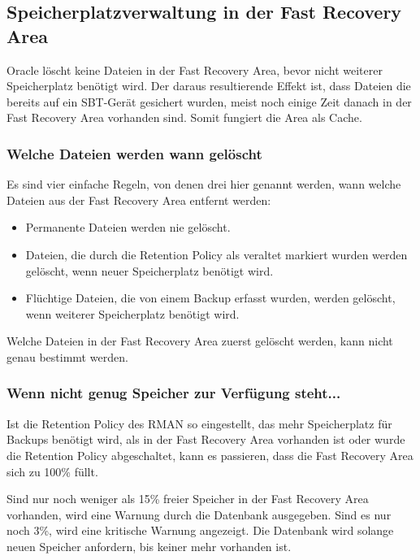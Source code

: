       \subsection{Speicherplatzverwaltung in der Fast Recovery Area}
        Oracle löscht keine Dateien in der Fast Recovery Area, bevor nicht weiterer Speicherplatz benötigt wird. Der daraus resultierende Effekt ist, dass Dateien die bereits auf ein SBT-Gerät gesichert wurden, meist noch einige Zeit danach in der Fast Recovery Area vorhanden sind. Somit fungiert die Area als Cache.
        \subsubsection{Welche Dateien werden wann gelöscht}
          Es sind vier einfache Regeln, von denen drei hier genannt werden, wann welche Dateien aus der Fast Recovery Area entfernt werden:
          \begin{itemize}
            \item Permanente Dateien werden nie gelöscht.
            \item Dateien, die durch die Retention Policy als veraltet markiert wurden werden ge\-löscht, wenn neuer Speicherplatz benötigt wird.
            \item Flüchtige Dateien, die von einem Backup erfasst wurden, werden gelöscht, wenn weiterer Speicherplatz benötigt wird.
          \end{itemize}
          \begin{merke}
            Welche Dateien in der Fast Recovery Area zuerst gelöscht werden, kann nicht genau bestimmt werden.
          \end{merke}
        \subsubsection{Wenn nicht genug Speicher zur Verfügung steht...}
          Ist die Retention Policy des RMAN so eingestellt, das mehr Speicherplatz für Backups benötigt wird, als in der Fast Recovery Area vorhanden ist oder wurde die Retention Policy abgeschaltet, kann es passieren, dass die Fast Recovery Area sich zu 100\% füllt.

          Sind nur noch weniger als 15\% freier Speicher in der Fast Recovery Area vorhanden, wird eine Warnung durch die Datenbank ausgegeben. Sind es nur noch 3\%, wird eine kritische Warnung angezeigt. Die Datenbank wird solange neuen Speicher anfordern, bis keiner mehr vorhanden ist.

